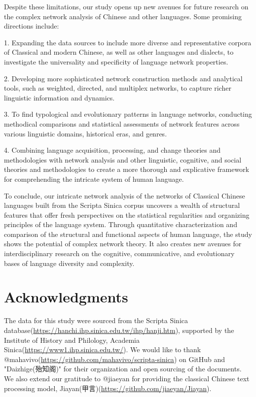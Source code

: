 \documentclass[11pt]{article}
\begin{document}
Despite these limitations, our study opens up new avenues for future research on the complex network analysis of Chinese and other languages. Some promising directions include:

1. Expanding the data sources to include more diverse and representative corpora of Classical and modern Chinese, as well as other languages and dialects, to investigate the universality and specificity of language network properties.

2. Developing more sophisticated network construction methods and analytical tools, such as weighted, directed, and multiplex networks, to capture richer linguistic information and dynamics.

3. To find typological and evolutionary patterns in language networks, conducting methodical comparisons and statistical assessments of network features across various linguistic domains, historical eras, and genres.

4. Combining language acquisition, processing, and change theories and methodologies with network analysis and other linguistic, cognitive, and social theories and methodologies to create a more thorough and explicative framework for comprehending the intricate system of human language.


To conclude, our intricate network analysis of the networks of Classical Chinese languages built from the Scripta Sinica corpus uncovers a wealth of structural features that offer fresh perspectives on the statistical regularities and organizing principles of the language system. Through quantitative characterization and comparison of the structural and functional aspects of human language, the study shows the potential of complex network theory. It also creates new avenues for interdisciplinary research on the cognitive, communicative, and evolutionary bases of language diversity and complexity.
\section*{Acknowledgments}
The data for this study were sourced from the Scripta Sinica database(\url{https://hanchi.ihp.sinica.edu.tw/ihp/hanji.htm}), supported by the Institute of History and Philology, Academia Sinica(\url{https://www1.ihp.sinica.edu.tw/}). We would like to thank @mahavivo(\url{https://github.com/mahavivo/scripta-sinica}) on GitHub and "Daizhige(殆知阁)" for their organization and open sourcing of the documents. We also extend our gratitude to @jiaeyan for providing the classical Chinese text processing model, Jiayan(甲言)(\url{https://github.com/jiaeyan/Jiayan}).
\end{document}
